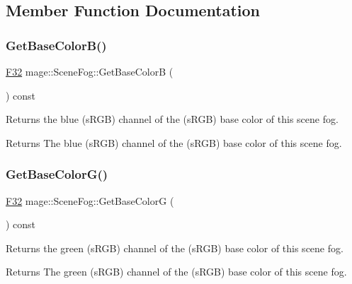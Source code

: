 \subsection{Member Function Documentation}
\hypertarget{classmage_1_1_scene_fog_ab223c70a71c13730425dee18061516bc}{}\label{classmage_1_1_scene_fog_ab223c70a71c13730425dee18061516bc} 
\subsubsection{\texorpdfstring{Get\+Base\+Color\+B()}{GetBaseColorB()}}
{\footnotesize\ttfamily \hyperlink{namespacemage_aa97e833b45f06d60a0a9c4fc22ae02c0}{F32} mage\+::\+Scene\+Fog\+::\+Get\+Base\+ColorB (\begin{DoxyParamCaption}{ }\end{DoxyParamCaption}) const\hspace{0.3cm}{\ttfamily [noexcept]}}

Returns the blue (s\+R\+GB) channel of the (s\+R\+GB) base color of this scene fog.

\begin{DoxyReturn}{Returns}
The blue (s\+R\+GB) channel of the (s\+R\+GB) base color of this scene fog. 
\end{DoxyReturn}
\hypertarget{classmage_1_1_scene_fog_a016dc4f134493d4af0420049c38e77ea}{}\label{classmage_1_1_scene_fog_a016dc4f134493d4af0420049c38e77ea} 
\subsubsection{\texorpdfstring{Get\+Base\+Color\+G()}{GetBaseColorG()}}
{\footnotesize\ttfamily \hyperlink{namespacemage_aa97e833b45f06d60a0a9c4fc22ae02c0}{F32} mage\+::\+Scene\+Fog\+::\+Get\+Base\+ColorG (\begin{DoxyParamCaption}{ }\end{DoxyParamCaption}) const\hspace{0.3cm}{\ttfamily [noexcept]}}

Returns the green (s\+R\+GB) channel of the (s\+R\+GB) base color of this scene fog.

\begin{DoxyReturn}{Returns}
The green (s\+R\+GB) channel of the (s\+R\+GB) base color of this scene fog. 
\end{DoxyReturn}
\hypertarget{classmage_1_1_scene_fog_a5eb899a4a5f0dc60edc82c88dcd1ca5a}{}\label{classmage_1_1_scene_fog_a5eb899a4a5f0dc60edc82c88dcd1ca5a} 
